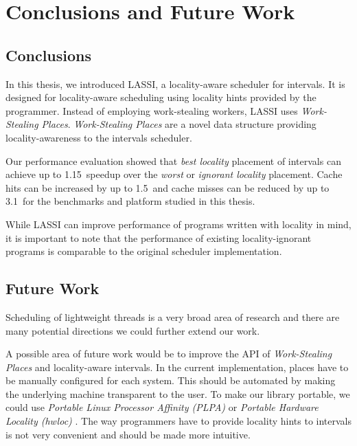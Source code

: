 
\chapter{Conclusions and Future Work}
\label{chap:locality-conclusions-and-future-work}

\section{Conclusions}
\label{sec:locality-conclusions-and-future-work-conclusions}

In this thesis, we introduced LASSI, a locality-aware scheduler for
intervals. It is designed for locality-aware scheduling using locality
hints provided by the programmer. Instead of employing work-stealing
workers, LASSI uses \emph{Work-Stealing Places}. \emph{Work-Stealing
  Places} are a novel data structure providing locality-awareness to
the intervals scheduler.

Our performance evaluation showed that \emph{best locality} placement
of intervals can achieve up to 1.15\texttimes\ speedup over the
\emph{worst} or \emph{ignorant locality} placement. Cache hits can be
increased by up to 1.5\texttimes\ and cache misses can be reduced by
up to 3.1\texttimes\ for the benchmarks and platform studied in this
thesis.


While LASSI can improve performance of programs written with locality
in mind, it is important to note that the performance of existing
locality-ignorant programs is comparable to the original scheduler
implementation.



\section{Future Work}
\label{sec:locality-conclusions-and-future-work-future-work}

Scheduling of lightweight threads is a very broad area of research and
there are many potential directions we could further extend our work.

A possible area of future work would be to improve the API of
\emph{Work-Stealing Places} and locality-aware intervals. In the
current implementation, places have to be manually configured for each
system. This should be automated by making the underlying machine
transparent to the user. To make our library portable, we could use
\emph{Portable Linux Processor Affinity (PLPA)} \cite{OpenMPI2010a} or
\emph{Portable Hardware Locality (hwloc)} \cite{OpenMPI2010}. The way
programmers have to provide locality hints to intervals is not very
convenient and should be made more intuitive.

